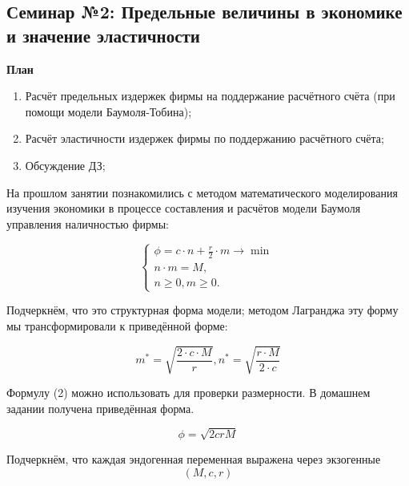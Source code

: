 \documentclass[12pt,a4paper]{article}
\author{GH-TIMe}
\begin{document}
\begin{center}
\section*{Семинар №2: Предельные величины в экономике и значение эластичности}
\end{center}

\begin{center}
\textbf{План}
\end{center}
\begin{enumerate}
\item Расчёт предельных издержек фирмы на поддержание расчётного счёта (при помощи модели Баумоля-Тобина);
\item Расчёт эластичности издержек фирмы по поддержанию расчётного счёта;
\item Обсуждение ДЗ;
\end{enumerate}

На прошлом занятии познакомились с методом математического моделирования изучения экономики в процессе составления и расчётов модели Баумоля управления наличностью фирмы:

\begin{equation}
	\begin{cases}
	\phi = c \cdot n + \displaystyle{\frac{r}{2}} \cdot m \rightarrow \min \\
	n \cdot m = M, \\
	n \geq 0, m \geq 0.
	\end{cases}
\end{equation}

Подчеркнём, что это структурная форма модели; методом Лагранджа эту форму мы трансформировали к приведённой форме:

\begin{equation}
m^*=\sqrt{\displaystyle{\frac{2 \cdot c \cdot M}{r}}}, n^*=\sqrt{\displaystyle{\frac{r \cdot M}{2 \cdot c}}}
\end{equation}

Формулу (2) можно использовать для проверки размерности. В домашнем задании получена приведённая форма.

\begin{equation}
\phi = \sqrt{2crM}
\end{equation}

Подчеркнём, что каждая эндогенная переменная выражена через экзогенные
\begin{equation}
(M, c, r)
\end{equation}
\end{document}
